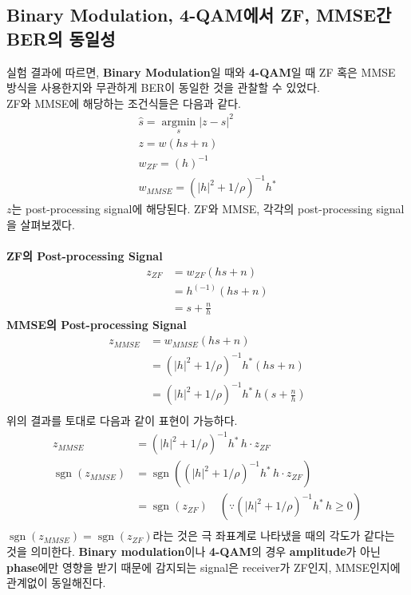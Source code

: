 \documentclass{article}
\newcommand{\bd}{\textbf} %
\providecommand{\abs}[1]{\lvert#1\rvert}
\newcommand{\sgn}{\operatorname{sgn}}
\begin{document}
\subsection{Binary Modulation, 4-QAM에서 ZF, MMSE간 BER의 동일성}
실험 결과에 따르면, \bd{Binary Modulation}일 때와 \bd{4-QAM}일 때 ZF 혹은 MMSE 방식을 사용한지와 무관하게 BER이 동일한 것을 관찰할 수 있었다.\\
ZF와 MMSE에 해당하는 조건식들은 다음과 같다.
\begin{gather}
\hat{s}=\operatorname*{argmin}_s \abs{z-s}^2\\
z=w(hs+n)\\
w_{ZF}=(h)^{-1}\\
w_{MMSE}=(\abs{h}^2+1/\rho)^{-1}h^*
\end{gather}
$z$는 post-processing signal에 해당된다. ZF와 MMSE, 각각의 post-processing signal을 살펴보겠다.\\
\\
\bd{ZF의 Post-processing Signal}
\begin{equation}
\begin{split}
z_{ZF}&=w_{ZF}(hs+n)\\
&=h^(-1)(hs+n)\\
&=s+\frac{n}{h}
\end{split}
\end{equation}
\bd{MMSE의 Post-processing Signal}
\begin{equation}
\begin{split}
z_{MMSE}&=w_{MMSE}(hs+n)\\
&=(\abs{h}^2+1/\rho)^{-1}h^*(hs+n)\\
&=(\abs{h}^2+1/\rho)^{-1}h^*\, h(s+\frac{n}{h})\\
\end{split}
\end{equation}
위의 결과를 토대로 다음과 같이 표현이 가능하다.
\begin{equation}
\begin{split}
z_{MMSE}&=(\abs{h}^2+1/\rho)^{-1}h^*\,h\cdot z_{ZF}\\
\sgn(z_{MMSE}) &= \sgn((\abs{h}^2+1/\rho)^{-1}h^*\,h\cdot z_{ZF})\\
&=\sgn(z_{ZF})\quad (\because (\abs{h}^2+1/\rho)^{-1}h^*\,h \geq 0) \\
\end{split}
\end{equation}
$\sgn(z_{MMSE})=\sgn(z_{ZF})$라는 것은 극 좌표계로 나타냈을 때의 각도가 같다는 것을 의미한다.  \bd{Binary modulation}이나 \bd{4-QAM}의 경우 \bd{amplitude}가 아닌 \bd{phase}에만 영향을 받기 때문에 감지되는 signal은 receiver가 ZF인지, MMSE인지에 관계없이 동일해진다.\\
\end{document}
